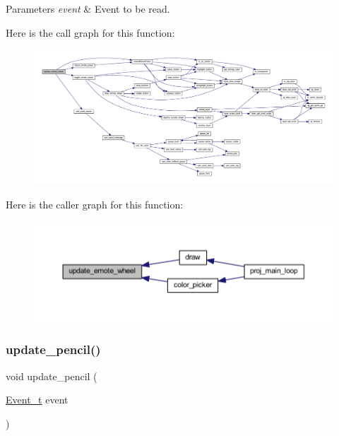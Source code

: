 \begin{DoxyParams}{Parameters}
{\em event} & Event to be read. \\
\hline
\end{DoxyParams}
Here is the call graph for this function\+:\nopagebreak
\begin{figure}[H]
\begin{center}
\leavevmode
\includegraphics[width=350pt]{group__pengoo_ga60a599fe4cffb804d5375495cdc35d9c_cgraph}
\end{center}
\end{figure}
Here is the caller graph for this function\+:\nopagebreak
\begin{figure}[H]
\begin{center}
\leavevmode
\includegraphics[width=350pt]{group__pengoo_ga60a599fe4cffb804d5375495cdc35d9c_icgraph}
\end{center}
\end{figure}
\mbox{\label{group__pengoo_ga3df244ae6ccf0baca3f8426c306d3802}} 
\subsubsection{\texorpdfstring{update\+\_\+pencil()}{update\_pencil()}}
{\footnotesize\ttfamily void update\+\_\+pencil (\begin{DoxyParamCaption}\item[{\mbox{\hyperlink{struct_event__t}{Event\+\_\+t}}}]{event }\end{DoxyParamCaption})}



